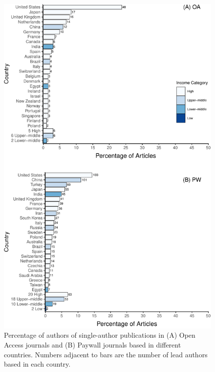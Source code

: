 \documentclass[english,man]{apa6}
\begin{document}
\begin{figure}

{\centering \includegraphics{Smith_etal_APC_ms_files/figure-latex/Fig1-1} 

}

\caption{Percentage of authors of single-author publications in (A) Open Access journals and (B) Paywall journals based in different countries. Numbers adjacent to bars are the number of lead authors based in each country.}\label{fig:Fig1}
\end{figure}
\end{document}
